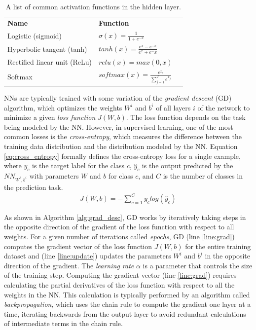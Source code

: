 \begin{table}[h]
    \centering
    \begin{tabular}{lll}
        \textbf{Name} & \textbf{Function} \\
        Logistic (sigmoid) & $\sigma(x) = \frac{1}{1 + e^{-x}}$ \\
        Hyperbolic tangent (tanh) & $tanh(x) = \frac{e^x - e^{-x}}{e^x + e^-x}$ \\
        Rectified linear unit (ReLu) & $relu(x) = max(0, x)$ \\
        Softmax & $softmax(x) = \frac{e^{x_i}}{\sum_{j=1}^{J} e^{x_j}}$ \\
    \end{tabular}
    \caption{A list of common activation functions in the hidden layer.}
    \label{tab:activation}
\end{table}

NNs are typically trained with some variation of the \textit{gradient descent} (GD) algorithm, which optimizes the weights $W^i$ and $b^i$ of all layers $i$ of the network to minimize a given \textit{loss function} $J(W,b)$. The loss function depends on the task being modeled by the NN. However, in supervised learning, one of the most common losses is the \textit{cross-entropy}, which measures the difference between the training data distribution and the distribution modeled by the NN. Equation \ref{eq:cross_entropy} formally defines the cross-entropy loss for a single example, where $y_c$ is the target label for the class $c$, $\hat{y}_c$ is the output predicted by the $NN_{W^i,b^i}$ with parameters $W$ and $b$ for class $c$, and $C$ is the number of classes in the prediction task.
\begin{equation} \label{eq:cross_entropy}
\begin{split}
    J(W,b) = -\sum_{c=1}^{C} y_clog(\hat{y}_c)
\end{split}
\end{equation}

As shown in Algorithm \ref{alg:grad_desc}, GD works by iteratively taking steps in the opposite direction of the gradient of the loss function with respect to all weights. For a given number of iterations called \textit{epochs}, GD (line \ref{line:grad}) computes the gradient vector of the loss function $J(W,b)$ for the entire training dataset and (line \ref{line:update}) updates the parameters $W^i$ and $b^i$ in the opposite direction of the gradient. The \textit{learning rate} $\alpha$ is a parameter that controls the size of the training step. Computing the gradient vector (line \ref{line:grad}) requires calculating the partial derivatives of the loss function with respect to all the weights in the NN. This calculation is typically performed by an algorithm called \textit{backpropagation}, which uses the chain rule to compute the gradient one layer at a time, iterating backwards from the output layer to avoid redundant calculations of intermediate terms in the chain rule.

